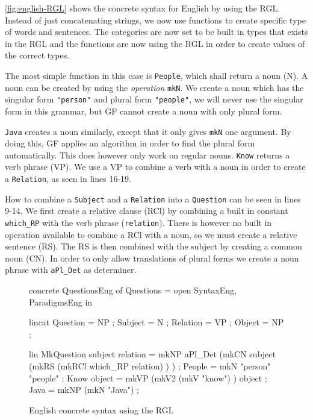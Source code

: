 \autoref{fig:english-RGL} shows the concrete syntax for English by using the RGL. Instead of just concatenating strings, we now use functions to create specific type of words and sentences. The categories are now set to be built in types that exists in the RGL and the functions are now using the RGL in order to create values of the correct types.

The most simple function in this case is \texttt{People}, which shall return a noun (N). A noun can be created by using the \emph{operation} \texttt{mkN}. We create a noun which has the singular form \texttt{"person"} and plural form \texttt{"people"}, we will never use the singular form in this grammar, but GF cannot create a noun with only plural form. 

\texttt{Java} creates a noun similarly, except that it only gives \texttt{mkN} one argument. By doing this, GF applies an algorithm in order to find the plural form automatically. This does however only work on regular nouns. \texttt{Know} returns a verb phrase (VP). We use a VP to combine a verb with a noun in order to create a \texttt{Relation}, as seen in lines 16-19. 

How to combine a \texttt{Subject} and a \texttt{Relation} into a \texttt{Question} can be seen in lines 9-14. We first create a relative clause (RCl) by combining a built in constant \texttt{which\_RP} with the verb phrase (\texttt{relation}). There is however no built in operation available to combine a RCl with a noun, so we must create a relative sentence (RS). The RS is then combined with the subject by creating a common noun (CN). In order to only allow translations of plural forms we create a noun phrase with \texttt{aPl\_Det} as determiner.

\begin{figure}[h]
\begin{code}
concrete QuestionsEng of Questions = open SyntaxEng, ParadigmsEng in {
  lincat
    Question = NP ;
    Subject = N ;
    Relation = VP ;
    Object = NP ;

  lin
    MkQuestion subject relation = mkNP aPl_Det 
                                        (mkCN subject 
                                            (mkRS 
                                                (mkRCl which_RP relation)
                                            )
                                        ) ;
    People = mkN "person" "people" ;
    Know object = mkVP 
                    (mkV2 
                        (mkV "know")
                    ) object ;
    Java = mkNP (mkN "Java") ;
}
\end{code}
\caption{English concrete syntax using the RGL\label{fig:english-RGL}}
\end{figure}


